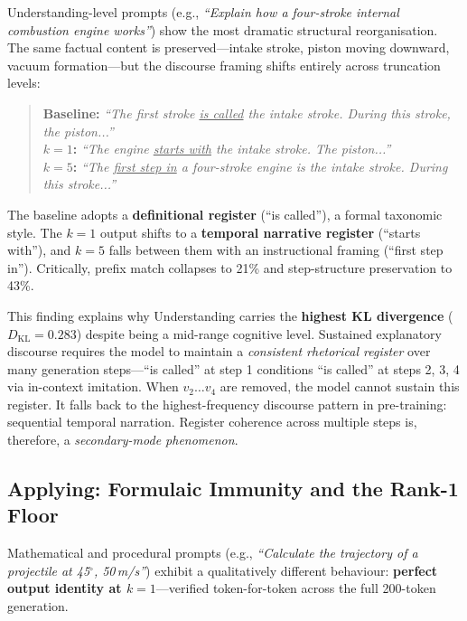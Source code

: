 Understanding-level prompts (e.g., \textit{``Explain how a four-stroke internal combustion engine works''})
show the most dramatic structural reorganisation.
The same factual content is preserved---intake stroke, piston moving downward, vacuum formation---but
the discourse framing shifts entirely across truncation levels:

\begin{quote}
\small
\textbf{Baseline:} \textit{``The first stroke \underline{is called} the intake stroke. During this stroke, the piston...''}\\
\textbf{$k=1$:}  \textit{``The engine \underline{starts with} the intake stroke. The piston...''}\\
\textbf{$k=5$:}  \textit{``The \underline{first step in} a four-stroke engine is the intake stroke. During this stroke...''}
\end{quote}

The baseline adopts a \textbf{definitional register} (``is called''), a formal taxonomic style.
The $k=1$ output shifts to a \textbf{temporal narrative register} (``starts with''),
and $k=5$ falls between them with an instructional framing (``first step in'').
Critically, prefix match collapses to 21\% and step-structure preservation to 43\%.

This finding explains why Understanding carries the \textbf{highest KL divergence} ($D_\mathrm{KL}=0.283$)
despite being a mid-range cognitive level.
Sustained explanatory discourse requires the model to maintain a \emph{consistent rhetorical register} over
many generation steps---``is called'' at step 1 conditions ``is called'' at steps 2, 3, 4 via in-context
imitation.
When $v_2\dots v_4$ are removed, the model cannot sustain this register.
It falls back to the highest-frequency discourse pattern in pre-training: sequential temporal narration.
Register coherence across multiple steps is, therefore, a \emph{secondary-mode phenomenon}.


\subsection{Applying: Formulaic Immunity and the Rank-1 Floor}
\label{sec:applying}

Mathematical and procedural prompts (e.g., \textit{``Calculate the trajectory of a projectile at 45$^\circ$,
50\,m/s''}) exhibit a qualitatively different behaviour: \textbf{perfect output identity at $k=1$}---verified
token-for-token across the full 200-token generation.

